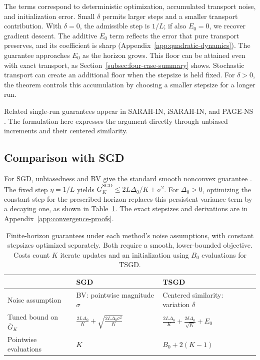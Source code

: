 The terms correspond to deterministic optimization, accumulated
transport noise, and initialization error. Small $\delta$ permits larger
steps and a smaller transport contribution. With $\delta=0$, the
admissible step is $1/L$; if also $E_0=0$, we recover gradient descent.
The additive $E_0$ term reflects the error that pure transport preserves,
and its coefficient is sharp (Appendix~\ref{app:quadratic-dynamics}).
The guarantee approaches $E_0$ as the horizon grows. This floor can be
attained even with exact transport, as
Section~\ref{subsec:four-case-summary} shows. Stochastic transport can
create an additional floor when the stepsize is held fixed. For
$\delta>0$, the theorem controls this accumulation by choosing a
smaller stepsize for a longer run.

Related single-run guarantees appear in SARAH-IN, iSARAH-IN, and
PAGE-NS \citep{nguyen2017sarah_nonconvex,nguyen2021inexact,sokolov2022nonconvex}.
The formulation here expresses the argument directly through unbiased
increments and their centered similarity.

\subsection{Comparison with SGD}
\label{subsec:sgd-guarantees}

For SGD, unbiasedness and BV give the standard smooth nonconvex
guarantee \citep{ghadimi2013stochastic}. The fixed step $\eta=1/L$
yields $\overline G_K^{\mathrm{SGD}}\leq2L\Delta_0/K+\sigma^2$.
For $\Delta_0>0$, optimizing the constant step for the prescribed
horizon replaces this persistent variance term by a decaying one, as
shown in Table~\ref{tab:sgd-tsgd-guarantees}. The exact stepsizes and
derivations are in Appendix~\ref{app:convergence-proofs}.

\begin{table}[t]
\centering
\small
\renewcommand{\arraystretch}{1.35}
\begin{tabular}{@{}p{}p{}p{}@{}}
\toprule
 & SGD & TSGD\\
\midrule
Noise assumption & BV: pointwise magnitude $\sigma$
  & Centered similarity: variation $\delta$\\
Tuned bound on $\overline G_K$
  & $\displaystyle\frac{2L\Delta_0}{K}
      +\sqrt{\frac{2L\Delta_0\sigma^2}{K}}$
  & $\displaystyle\frac{2L\Delta_0}{K}
      +\frac{2\delta\Delta_0}{\sqrt K}+E_0$\\
Pointwise evaluations & $K$ & $B_0+2(K-1)$\\
\bottomrule
\end{tabular}
\caption{Finite-horizon guarantees under each method's noise assumptions,
with constant stepsizes optimized separately. Both require a smooth,
lower-bounded objective. Costs count $K$ iterate updates and an
initialization using $B_0$ evaluations for TSGD.}
\label{tab:sgd-tsgd-guarantees}
\end{table}

